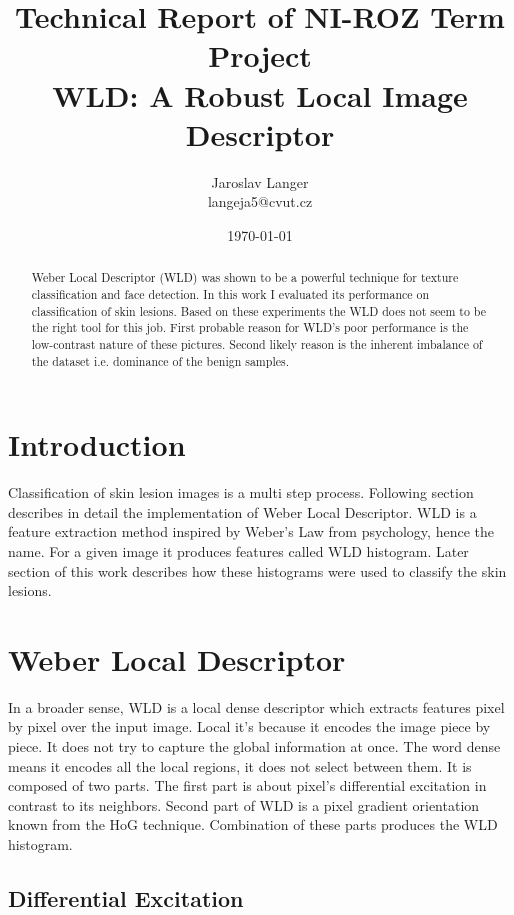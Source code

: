 \documentclass[a4paper,10pt,twocolumn]{article}
\title{Technical Report of NI-ROZ Term Project \\ WLD: A Robust Local Image Descriptor}
\date{\today}
\author{Jaroslav Langer \\ langeja5@cvut.cz}
\begin{document}
\maketitle

\begin{abstract}
Weber Local Descriptor (WLD) was shown to be a powerful technique for texture classification and face detection.
In this work I evaluated its performance on classification of skin lesions.
Based on these experiments the WLD does not seem to be the right tool for this job.
First probable reason for WLD's poor performance is the low-contrast nature of these pictures.
Second likely reason is the inherent imbalance of the dataset i.e. dominance of the benign samples.
\end{abstract}


\section{Introduction}
Classification of skin lesion images is a multi step process.
Following section describes in detail the implementation of Weber Local Descriptor\cite{chen2010wld}.
WLD is a feature extraction method inspired by Weber's Law from psychology, hence the name.
For a given image it produces features called WLD histogram.
Later section of this work describes how these histograms were used to classify the skin lesions.


\section{Weber Local Descriptor}
% 
In a broader sense, WLD is a local dense descriptor which extracts features pixel by pixel over the input image.
Local it's because it encodes the image piece by piece.
It does not try to capture the global information at once.
The word dense means it encodes all the local regions, it does not select between them.
It is composed of two parts.
The first part is about pixel's differential excitation in contrast to its neighbors.
Second part of WLD is a pixel gradient orientation known from the HoG technique.
Combination of these parts produces the WLD histogram.

\subsection{Differential Excitation}
\end{document}
